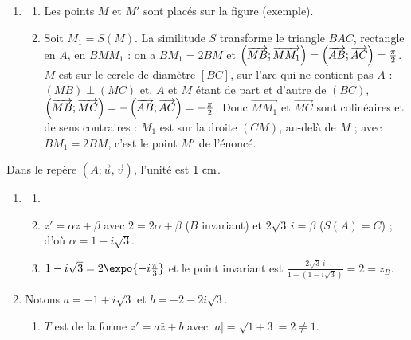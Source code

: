 \begin{description}
\begin{enumerate}
			\par\noindent{}
		\item
		\begin{enumerate}
			\item Les points $M$ et $M'$ sont placés sur la figure (exemple).
			\item {}
				Soit $M_1 = S(M)$. La similitude $S$ transforme le triangle $BAC$, rectangle en $A$, en $BMM_1$ : on a $BM_1 = 2BM$ et
				$\left( \overrightarrow{MB} ; \overrightarrow{MM_1} \right) = \left( \overrightarrow{AB} ; \overrightarrow{AC} \right) = \frac{\pi}{2}$.
				$M$ est sur le cercle de diamètre $[BC]$, sur l'arc qui ne contient pas $A$ : $(MB) \perp (MC)$ et, $A$ et $M$ étant de part et d'autre de $(BC)$,
				$\left( \overrightarrow{MB} ; \overrightarrow{MC} \right) = -\left( \overrightarrow{AB} ; \overrightarrow{AC} \right) = -\frac{\pi}{2}$.
				Donc $\overrightarrow{MM_1}$ et $\overrightarrow{MC}$ sont colinéaires et de sens contraires : $M_1$ est sur la droite $(CM)$, au-delà de $M$ ;
				avec $BM_1 = 2BM$, c'est le point $M'$ de l'énoncé.
				\par\noindent{}
		\end{enumerate}
	\end{enumerate}
	\item[III. ] Dans le repère $(A;\vec{u},\vec{v})$, l'unité est $1~\mathrm{cm}$.
	\begin{enumerate}
		\item
		\begin{enumerate}
			\item {}
			\item {}
				$z' = \alpha z + \beta$ avec $2 = 2\alpha + \beta$ ($B$ invariant) et $2\sqrt{3}\,i = \beta$ ($S(A) = C$) ; d'où $\alpha = 1 - i\sqrt{3}$.
				\par\noindent{}
			\item {}
				$1 - i\sqrt{3} = 2\expo{-i\frac{\pi}{3}}$ et le point invariant est $\frac{2\sqrt{3}\,i}{1 - (1 - i\sqrt{3})} = 2 = z_B$.
				\par\noindent{}
		\end{enumerate}
		\item Notons $a = -1 + i\sqrt{3}$ et $b = -2 - 2i\sqrt{3}$.
		\begin{enumerate}
			\item {}
				$T$ est de la forme $z' = a\bar{z} + b$ avec $|a| = \sqrt{1 + 3} = 2 \neq 1$.

\end{enumerate}
\end{enumerate}
\end{description}

